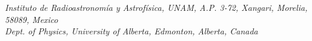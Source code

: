 {    {\morelia}{\it{Instituto de Radioastronom{\'i}a y Astrof{\'i}sica, UNAM, A.P. 3-72, Xangari, Morelia, 58089, Mexico}} \\
    {\uofa}{\it{Dept. of Physics, University of Alberta, Edmonton, Alberta, Canada}}\\
    }


